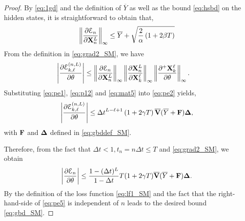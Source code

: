 \documentclass{article}
\newcommand{\bV}{{\bf V}}
\newcommand{\bX}{{\bf X}}
\newcommand{\Dt}{{\Delta t}}
\newcommand{\E}{\EuScript{E}}
\begin{document}
\begin{proof}
By \eqref{eq:1gd} and the definition of $\overline{Y}$ as well as the bound \eqref{eq:hsbd} on the hidden states, it is straightforward to obtain that,
\begin{equation}
    \label{eq:pe1}
    \left\|\frac{\partial \E_n}{\partial \bX^L_n}\right\|_{\infty} \leq \overline{Y} + \sqrt{\frac{2}{\alpha}\left(1+2\beta T\right)}
\end{equation}
From the definition in \eqref{eq:grad2_SM}, we have
\begin{equation}
    \label{eq:pe2}
    \begin{aligned}
    \left|\frac{\partial \E^{(n,L)}_{k,\ell}}{\partial \theta}\right| &\leq \left\|\frac{\partial \E_n}{\partial \bX^L_n} \right\|_{\infty} \left\|\frac{\partial \bX^L_n}{\partial \bX^\ell_k}\right\|_{\infty} \left\|\frac{\partial^{+} \bX^\ell_k}{\partial \theta}\right\|_{\infty}.
    \end{aligned}
\end{equation}
Substituting \eqref{eq:pe1}, \eqref{eq:p12} and \eqref{eq:mat5} into \eqref{eq:pe2} yields,
\begin{equation}
    \label{eq:pe3}
     \left|\frac{\partial \E^{(n,L)}_{k,\ell}}{\partial \theta}\right| \leq \Dt^{L-\ell+1}\left(1+2\gamma T\right) \overline{\bV}(\overline{Y} + {\bf F}){\bf \Delta},
\end{equation}
with ${\bf F}$ and ${\bf \Delta}$ defined in \eqref{eq:gbddef_SM}.

Therefore, from the fact that $\Dt < 1, t_n = n\Dt \leq T$ and \eqref{eq:grad2_SM}, we obtain
\begin{equation}
    \label{eq:pe5}
    \left|\frac{\partial \E_n}{\partial \theta}\right| \leq \frac{1-(\Dt)^L}{1-\Dt}T (1 +2\gamma T) \overline{\bV}(\overline{Y} + {\bf F}){\bf \Delta}.
\end{equation}
By the definition of the loss function \eqref{eq:lf1_SM} and the fact that the right-hand-side of \eqref{eq:pe5} is independent of $n$ leads to the desired bound \eqref{eq:gbd_SM}. 







\end{proof}
\end{document}
